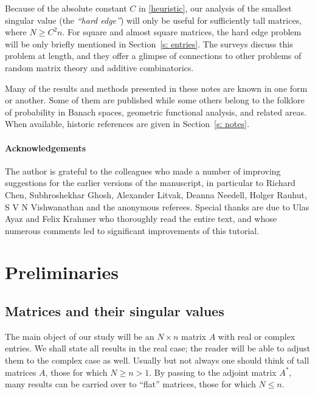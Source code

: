 \documentclass[10pt, openany]{book}
\theoremstyle{remark}
\begin{document}
Because of the absolute constant $C$ in \eqref{heuristic}, our analysis of
the smallest singular value (the {\em ``hard edge''}) will only be useful for sufficiently tall matrices, where $N \ge C^2 n$. 
For square and almost square matrices, the hard edge problem will be only briefly mentioned in Section~\ref{s: entries}.
The surveys \cite{Tao-Vu survey, RV ICM} discuss this problem at length, and they offer a glimpse
of connections to other problems of random matrix theory 
and additive combinatorics.

Many of the results and methods presented in these notes are known in one form or another.
Some of them are published while some others belong to the folklore of probability in Banach spaces, 
geometric functional analysis, and related areas. 
When available, historic references are given in Section~\ref{s: notes}.


\paragraph{Acknowledgements}
The author is grateful to the colleagues who made a number of improving suggestions for the 
earlier versions of the manuscript, in particular to Richard Chen, Subhroshekhar Ghosh, Alexander Litvak, Deanna Needell, Holger Rauhut, 
S V N Vishwanathan and the anonymous referees. Special thanks are due to Ulas Ayaz and Felix Krahmer
who thoroughly read the entire text, and whose numerous comments led to significant improvements of 
this tutorial.



\section{Preliminaries}			\label{s: preliminaries}

\subsection{Matrices and their singular values}

The main object of our study will be an $N \times n$ matrix $A$ with real or complex entries. 
We shall state all results in the real case; the reader will be able 
to adjust them to the complex case as well. Usually but not always one should think of tall matrices $A$, 
those for which $N \ge n > 1$. By passing to the adjoint matrix $A^*$, many results can be carried over 
to ``flat'' matrices, those for which $N \le n$. 
\end{document}
